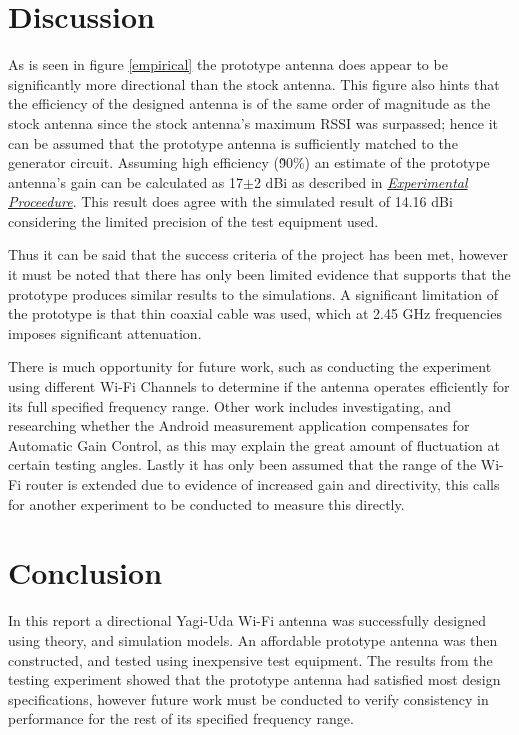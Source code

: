 \documentclass[10pt,twocolumn,hidelinks]{witseiepaper}
\begin{document}
\section{Discussion}
As is seen in figure \ref{empirical} the prototype antenna does appear to
be significantly more directional than the stock antenna. This figure also
hints that the efficiency of the designed antenna is of the same order of
magnitude as the stock antenna since the stock antenna's maximum RSSI was
surpassed; hence it can be assumed that the prototype antenna is
sufficiently matched to the generator circuit. Assuming high efficiency
(\~90\%) an estimate of the prototype antenna's gain can be calculated as
17$\pm$2 dBi as described in \hyperref[expproc]{\textit{Experimental
Proceedure}}. This result does agree with the simulated result of 14.16 dBi
considering the limited precision of the test equipment used.

Thus it can be said that the success criteria of the project has been met,
however it must be noted that there has only been limited evidence that
supports that the prototype produces similar results to the simulations. A
significant limitation of the prototype is that thin coaxial cable was
used, which at 2.45 GHz frequencies imposes significant
attenuation\cite{rg174}.

There is much opportunity for future work, such as conducting the
experiment using different Wi-Fi Channels to determine if the antenna
operates efficiently for its full specified frequency range. Other work
includes investigating, and researching whether the Android measurement
application compensates for Automatic Gain Control, as this may explain the
great amount of fluctuation at certain testing angles. Lastly it has only
been assumed that the range of the Wi-Fi router is extended due to evidence
of increased gain and directivity, this calls for another experiment to be
conducted to measure this directly.
\section{Conclusion}
In this report a directional Yagi-Uda Wi-Fi antenna was successfully
designed using theory, and simulation models. An affordable prototype
antenna was then constructed, and tested using inexpensive test equipment.
The results from the testing experiment showed that the prototype antenna
had satisfied most design specifications, however future work must be
conducted to verify consistency in performance for the rest of its
specified frequency range.
\end{document}
